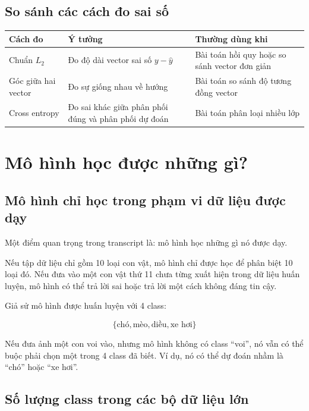 \subsection{So sánh các cách đo sai số}

\begin{center}
\begin{tabular}{p{}p{}p{}}
\toprule
Cách đo & Ý tưởng & Thường dùng khi \\
\midrule
Chuẩn $L_2$ & Đo độ dài vector sai số $y-\hat{y}$ & Bài toán hồi quy hoặc so sánh vector đơn giản \\
Góc giữa hai vector & Đo sự giống nhau về hướng & Bài toán so sánh độ tương đồng vector \\
Cross entropy & Đo sai khác giữa phân phối đúng và phân phối dự đoán & Bài toán phân loại nhiều lớp \\
\bottomrule
\end{tabular}
\end{center}

\section{Mô hình học được những gì?}

\subsection{Mô hình chỉ học trong phạm vi dữ liệu được dạy}

Một điểm quan trọng trong transcript là: mô hình học những gì nó được dạy.

Nếu tập dữ liệu chỉ gồm 10 loại con vật, mô hình chỉ được học để phân biệt 10 loại đó. Nếu đưa vào một con vật thứ 11 chưa từng xuất hiện trong dữ liệu huấn luyện, mô hình có thể trả lời sai hoặc trả lời một cách không đáng tin cậy.

\begin{vidu}
Giả sử mô hình được huấn luyện với 4 class:

\[
    \{\text{chó},\text{mèo},\text{diều},\text{xe hơi}\}
\]

Nếu đưa ảnh một con voi vào, nhưng mô hình không có class ``voi'', nó vẫn có thể buộc phải chọn một trong 4 class đã biết. Ví dụ, nó có thể dự đoán nhầm là ``chó'' hoặc ``xe hơi''.
\end{vidu}

\subsection{Số lượng class trong các bộ dữ liệu lớn}

